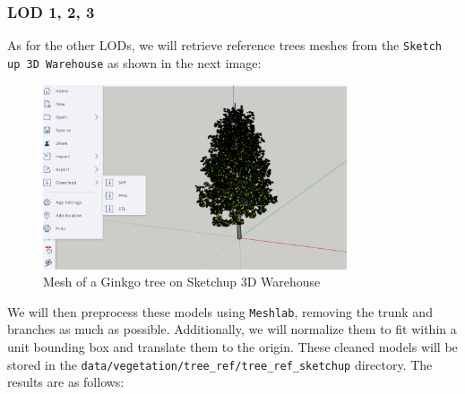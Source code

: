 \documentclass[12pt]{article}
\begin{document}
\subsubsection{LOD 1, 2, 3}
As for the other LODs, we will retrieve reference trees meshes from the
\texttt{Sketch up 3D Warehouse}\cite{sketchup} as shown in the next image:
\begin{figure}[H]
    \centering
        \centering
        \includegraphics[width=0.8\textwidth]{images/ginkgo-sketchup.png}
        \caption{Mesh of a Ginkgo tree on Sketchup 3D Warehouse}
\end{figure}

We will then preprocess these models using \texttt{Meshlab}\cite{meshlab}, removing 
the trunk and branches as much as possible. Additionally, we will normalize them
 to fit within a unit bounding box and translate them to the origin. These cleaned
  models will be stored in the \texttt{data/vegetation/tree\_ref/tree\_ref\_sketchup} directory.
 The results are as follows:
\end{document}
